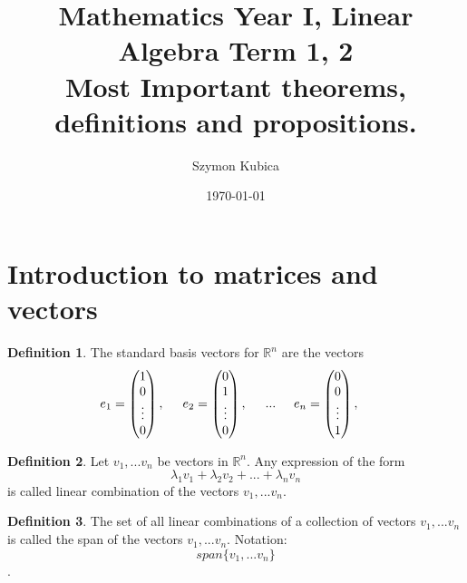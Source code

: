 \documentclass[11pt,a4paper]{article}
\newcommand\R{\mathbb{R}}
\theoremstyle{definition}
\newtheorem{definition}{Definition}
\begin{document}
\title{Mathematics Year I, Linear Algebra Term 1, 2 \\ Most Important theorems, definitions and propositions. } 
\date{\today}
\author{Szymon Kubica} 
\maketitle

\section{Introduction to matrices and vectors}
\begin{definition}
    The standard basis vectors for $ \R^n $ are the vectors
    \begin{align}
        e_1 &= \begin{pmatrix}
            1 \\
            0 \\ 
            \vdots \\
            0
        \end{pmatrix},
        \hspace{0.5cm}
        e_2 = \begin{pmatrix}
            0 \\
            1 \\ 
            \vdots \\
            0
        \end{pmatrix},
        \hspace{0.5cm}
        ...
        \hspace{0.5cm}
        e_n = \begin{pmatrix}
            0 \\
            0 \\ 
            \vdots \\
            1
        \end{pmatrix},
    \end{align}
\end{definition}

\begin{definition}
    Let $ v_1, ... v_n $ be vectors in $ \R^n $. Any expression of the form
    \[ \lambda_1v_1 + \lambda_2 v_2 + ... + \lambda_n v_n\]
    is called linear combination of the vectors $ v_1, ... v_n $.
\end{definition}

\begin{definition}
    The set of all linear combinations of a collection of vectors $ v_1, ... v_n $ is called the span of the vectors $ v_1, ... v_n $.
    Notation: \[span\{  v_1, ... v_n  \}\].
\end{definition}
\end{document}
